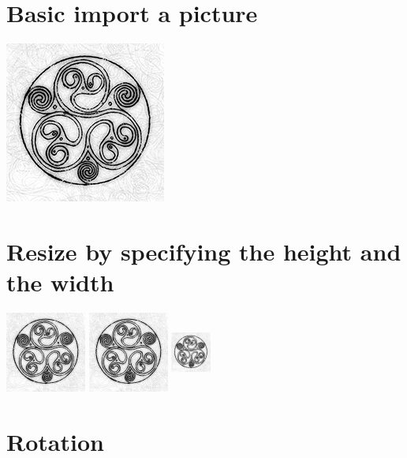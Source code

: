 \documentclass{article}
\begin{document}
\section*{Basic import a picture}

\includegraphics{helvetios}

\section*{Resize by specifying the height and the width}

\includegraphics[width=100px]{helvetios}
\includegraphics[height=100px]{helvetios}
\includegraphics[height=100px,width=50px]{helvetios}

\section*{Rotation}
\end{document}
